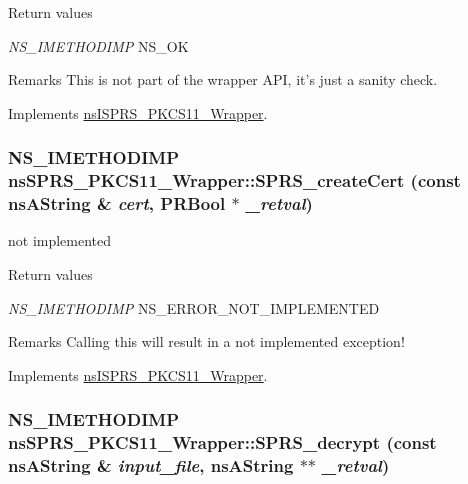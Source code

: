\begin{DoxyRetVals}{Return values}
\item[{\em NS\_\-IMETHODIMP}]NS\_\-OK \end{DoxyRetVals}
\begin{DoxyRemark}{Remarks}
This is not part of the wrapper API, it's just a sanity check. 
\end{DoxyRemark}


Implements \hyperlink{classnsISPRS__PKCS11__Wrapper}{nsISPRS\_\-PKCS11\_\-Wrapper}.\hypertarget{classnsSPRS__PKCS11__Wrapper_ac5b15eb2d80b960cb4f3d23e2b9b7915}{
\subsubsection[{SPRS\_\-createCert}]{\setlength{\rightskip}{0pt plus 5cm}NS\_\-IMETHODIMP nsSPRS\_\-PKCS11\_\-Wrapper::SPRS\_\-createCert (const nsAString \& {\em cert}, \/  PRBool $\ast$ {\em \_\-retval})}}
\label{classnsSPRS__PKCS11__Wrapper_ac5b15eb2d80b960cb4f3d23e2b9b7915}


not implemented 
\begin{DoxyRetVals}{Return values}
\item[{\em NS\_\-IMETHODIMP}]NS\_\-ERROR\_\-NOT\_\-IMPLEMENTED \end{DoxyRetVals}
\begin{DoxyRemark}{Remarks}
Calling this will result in a not implemented exception! 
\end{DoxyRemark}


Implements \hyperlink{classnsISPRS__PKCS11__Wrapper}{nsISPRS\_\-PKCS11\_\-Wrapper}.\hypertarget{classnsSPRS__PKCS11__Wrapper_a167706db1c7f17e6414ec0514c45734b}{
\subsubsection[{SPRS\_\-decrypt}]{\setlength{\rightskip}{0pt plus 5cm}NS\_\-IMETHODIMP nsSPRS\_\-PKCS11\_\-Wrapper::SPRS\_\-decrypt (const nsAString \& {\em input\_\-file}, \/  nsAString $\ast$$\ast$ {\em \_\-retval})}}
\label{classnsSPRS__PKCS11__Wrapper_a167706db1c7f17e6414ec0514c45734b}


